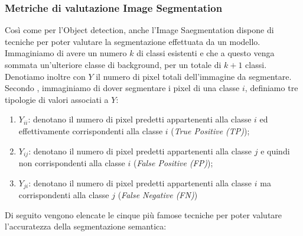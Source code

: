 \subsubsection{Metriche di valutazione Image Segmentation}
Così come per l'Object detection, anche l'Image Saegmentation dispone di tecniche 
per poter valutare la segmentazione effettuata da un modello. Immaginiamo di 
avere un numero $k$ di classi esistenti e che a questo venga sommata un'ulteriore 
classe di background, per un totale di $k+1$ classi. Denotiamo inoltre con $Y$ il 
numero di pixel totali dell'immagine da segmentare. Secondo \cite{metric_semantic_seg}, immaginiamo di dover segmentare i pixel di una classe $i$, definiamo tre 
tipologie di valori associati a $Y$:
\begin{enumerate}
    \item $Y_{ii}$: denotano il numero di pixel predetti appartenenti alla classe $i$ ed 
    effettivamente corrispondenti alla classe $i$ (\emph{True Positive (TP)});
    \item $Y_{ij}$: denotano il numero di pixel predetti appartenenti alla classe $j$ e quindi 
    non corrispondenti alla classe $i$ (\emph{False Positive (FP)});
    \item $Y_{ji}$: denotano il numero di pixel predetti appartenenti alla classe $i$ ma 
    corrispondenti alla classe $j$ (\emph{False Negative (FN)})
\end{enumerate}
Di seguito vengono elencate le cinque più famose tecniche per poter valutare 
l'accuratezza della segmentazione semantica:
